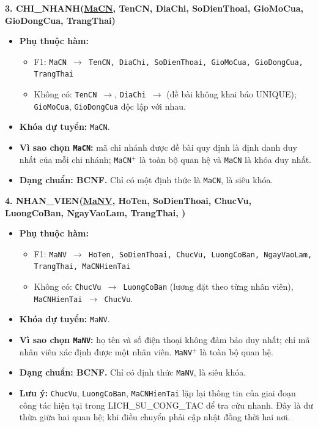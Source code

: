 \documentclass[11pt, a4paper]{article}
\newcommand{\pk}[1]{\bgroup\ULdepth=1.8pt\uline{#1}\egroup}
\newcommand{\fk}[1]{\bgroup\ULdepth=1.8pt\dashuline{#1}\egroup}
\begin{document}
\textbf{3. CHI\_NHANH(\pk{MaCN}, TenCN, DiaChi, SoDienThoai, GioMoCua, GioDongCua, TrangThai)}
\begin{itemize}
    \item \textbf{Phụ thuộc hàm:}
    \begin{itemize}
        \item F1: \texttt{MaCN $\rightarrow$ TenCN, DiaChi, SoDienThoai, GioMoCua, GioDongCua, TrangThai}
        \item Không có: \texttt{TenCN $\rightarrow$}, \texttt{DiaChi $\rightarrow$} (đề bài không khai báo UNIQUE); \texttt{GioMoCua}, \texttt{GioDongCua} độc lập với nhau.
    \end{itemize}
    \item \textbf{Khóa dự tuyển:} \texttt{MaCN}.
    \item \textbf{Vì sao chọn \texttt{MaCN}:} mã chi nhánh được đề bài quy định là định danh duy nhất của mỗi chi nhánh; \texttt{MaCN$^+$} là toàn bộ quan hệ và \texttt{MaCN} là khóa duy nhất.
    \item \textbf{Dạng chuẩn: BCNF.} Chỉ có một định thức là \texttt{MaCN}, là siêu khóa.
\end{itemize}

\textbf{4. NHAN\_VIEN(\pk{MaNV}, HoTen, SoDienThoai, ChucVu, LuongCoBan, NgayVaoLam, TrangThai, \fk{MaCNHienTai})}
\begin{itemize}
    \item \textbf{Phụ thuộc hàm:}
    \begin{itemize}
        \item F1: \texttt{MaNV $\rightarrow$ HoTen, SoDienThoai, ChucVu, LuongCoBan, NgayVaoLam, TrangThai, MaCNHienTai}
        \item Không có: \texttt{ChucVu $\rightarrow$ LuongCoBan} (lương đặt theo từng nhân viên), \texttt{MaCNHienTai $\rightarrow$ ChucVu}.
    \end{itemize}
    \item \textbf{Khóa dự tuyển:} \texttt{MaNV}.
    \item \textbf{Vì sao chọn \texttt{MaNV}:} họ tên và số điện thoại không đảm bảo duy nhất; chỉ mã nhân viên xác định được một nhân viên. \texttt{MaNV$^+$} là toàn bộ quan hệ.
    \item \textbf{Dạng chuẩn: BCNF.} Chỉ có định thức \texttt{MaNV}, là siêu khóa.
    \item \textbf{Lưu ý:} \texttt{ChucVu}, \texttt{LuongCoBan}, \texttt{MaCNHienTai} lặp lại thông tin của giai đoạn công tác hiện tại trong LICH\_SU\_CONG\_TAC để tra cứu nhanh. Đây là dư thừa giữa hai quan hệ; khi điều chuyển phải cập nhật đồng thời hai nơi.
\end{itemize}
\end{document}
